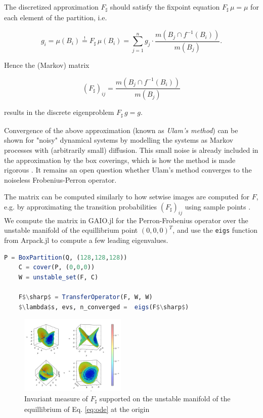 \documentclass{juliacon}
\begin{document}
The discretized approximation $F_\sharp$ should satisfy the fixpoint equation $F_\sharp\, \mu = \mu$ for each element of the partition, i.e.

\begin{equation}
    g_i = \mu (B_i) \overset{!}{=} F_\sharp\, \mu (B_i) = 
    \sum_{j=1}^{n} g_j \cdot \frac{m(B_j \cap f^{-1} (B_i))}{m(B_j)}. 
\end{equation}

Hence the (Markov) matrix 

\begin{equation}
    ( F_\sharp )_{ij} = \frac{m(B_j \cap f^{-1} (B_i))}{m(B_j)}
\end{equation}

results in the discrete eigenproblem $F_\sharp\, g = g$. 

Convergence of the above approximation (known as \emph{Ulam's method}) can be shown for "noisy" dynamical systems by modelling the systems as Markov processes with (arbitrarily small) diffusion. This small noise is already included in the approximation by the box coverings, which is how the method is made rigorous \cite{complicatedbehavior}. It remains an open question whether Ulam's method converges to the noiseless Frobenius-Perron operator. 

The matrix can be computed similarly to how setwise images are computed for $F$, e.g. by approximating the transition probabilities $(F_\sharp)_{ij}$ using sample points \cite{rigoroussampling}. We compute the matrix in GAIO.jl for the Perron-Frobenius operator over the unstable manifold of the equillibrium point $(0,0,0)^T$, and use the \texttt{eigs} function from Arpack.jl to compute a few leading eigenvalues. 

\begin{lstlisting}[language=Julia,mathescape]
    P = BoxPartition(Q, (128,128,128))
    C = cover(P, (0,0,0))
    W = unstable_set(F, C)
    
    F$\sharp$ = TransferOperator(F, W, W)
    $\lambda$s, evs, n_converged =  eigs(F$\sharp$)
\end{lstlisting}

\begin{figure}
    \centering
    \includegraphics[width=0.45\textwidth]{inv_measure.png}
    \caption{Invariant measure of $F_\sharp$ supported on the unstable manifold of the equillibrium of Eq. \ref{eq:ode} at the origin}
    \label{fig:invariantmeasure}
\end{figure}
\end{document}
